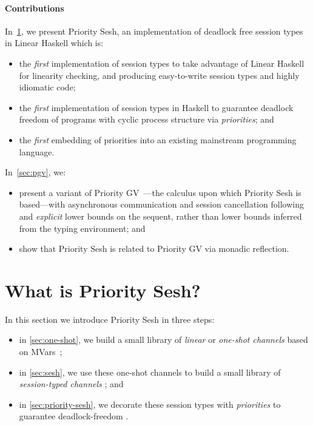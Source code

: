 \documentclass[sigplan,screen]{acmart}
\begin{document}
\paragraph{Contributions}
In~\cref{sec:main}, we present Priority Sesh, an implementation of deadlock free session types in Linear Haskell which is:
\begin{itemize}
\item
  the \emph{first} implementation of session types to take advantage of Linear Haskell for linearity checking, and producing easy-to-write session types and highly idiomatic code;
\item
  the \emph{first} implementation of session types in Haskell to guarantee deadlock freedom of programs with cyclic process structure via \emph{priorities}; and
\item
  the \emph{first} embedding of priorities into an existing mainstream programming language.
\end{itemize}
In~\cref{sec:pgv}, we:
\begin{itemize}
\item
  present a variant of Priority GV~\cite{kokkedardha21}---the calculus upon which Priority Sesh is based---with asynchronous communication and session cancellation following~\citet{fowlerlindley19} and \emph{explicit} lower bounds on the sequent, rather than lower bounds inferred from the typing environment; and
\item
  show that Priority Sesh is related to Priority GV via monadic reflection.
\end{itemize}
%
%
%
%
%
%
%
%
%
%

\section{What is Priority Sesh?}\label{sec:main}

In this section we introduce Priority Sesh in three steps:
\begin{itemize}
\item in \cref{sec:one-shot}, we build a small library of \emph{linear} or \emph{one-shot channels} based on MVars~\cite{peytonjonesgordon96};
\item in \cref{sec:sesh}, we use these one-shot channels to build a small library of \emph{session-typed channels} \cite{dardhagiachino12}; and
\item in \cref{sec:priority-sesh}, we decorate these session types with \emph{priorities} to guarantee deadlock-freedom \cite{kokkedardha21}.
\end{itemize}
\end{document}
